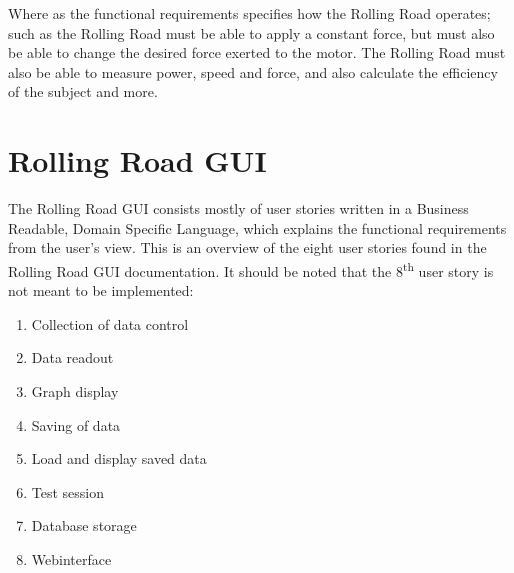 Where as the functional requirements specifies how the Rolling Road operates; such as the Rolling Road must be able to apply a constant force, but must also be able to change the desired force exerted to the motor. The Rolling Road must also be able to measure power, speed and force, and also calculate the efficiency of the subject and more.

\newpage
\section{Rolling Road GUI}
The Rolling Road GUI consists mostly of user stories written in a Business Readable, Domain Specific Language, which explains the functional requirements from the user's view.
This is an overview of the eight user stories found in the Rolling Road GUI documentation\cite{GUI}. It should be noted that the 8\textsuperscript{th} user story is not meant to be implemented:

\begin{enumerate}[US1:]
	\item Collection of data control
	\item Data readout
	\item Graph display
	\item Saving of data
	\item Load and display saved data
	\item Test session
	\item Database storage
	\item Webinterface
\end{enumerate}